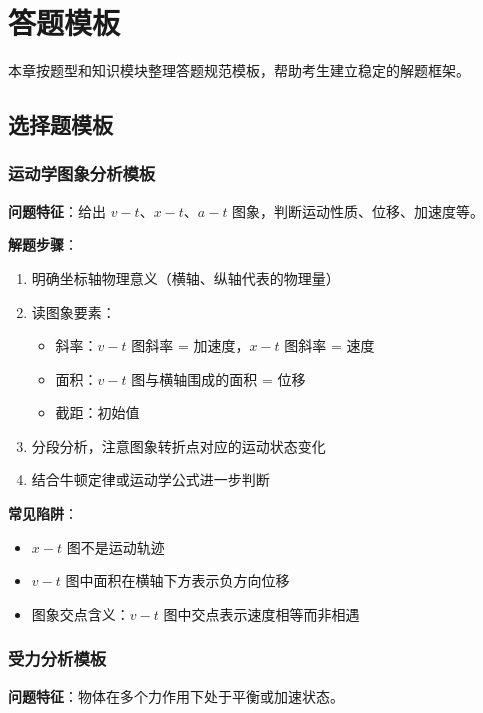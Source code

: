 \section{答题模板}

本章按题型和知识模块整理答题规范模板，帮助考生建立稳定的解题框架。

\subsection{选择题模板}

\subsubsection{运动学图象分析模板}

\textbf{问题特征}：给出 $v-t$、$x-t$、$a-t$ 图象，判断运动性质、位移、加速度等。

\textbf{解题步骤}：
\begin{enumerate}
  \item 明确坐标轴物理意义（横轴、纵轴代表的物理量）
  \item 读图象要素：
    \begin{itemize}
      \item 斜率：$v-t$ 图斜率 = 加速度，$x-t$ 图斜率 = 速度
      \item 面积：$v-t$ 图与横轴围成的面积 = 位移
      \item 截距：初始值
    \end{itemize}
  \item 分段分析，注意图象转折点对应的运动状态变化
  \item 结合牛顿定律或运动学公式进一步判断
\end{enumerate}

\textbf{常见陷阱}：
\begin{itemize}
  \item $x-t$ 图不是运动轨迹
  \item $v-t$ 图中面积在横轴下方表示负方向位移
  \item 图象交点含义：$v-t$ 图中交点表示速度相等而非相遇
\end{itemize}

\subsubsection{受力分析模板}

\textbf{问题特征}：物体在多个力作用下处于平衡或加速状态。


